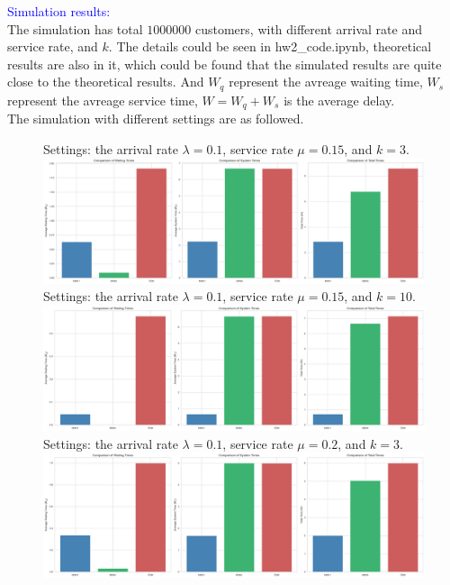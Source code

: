 \begin{homeworkProblem}
\textcolor{blue}{Simulation results:} \\
The simulation has total $1000000$ customers, with different arrival rate and service rate, and $k$. The details could be seen in hw2\_code.ipynb, theoretical results are also in it, which could be found that the simulated results are quite close to the theoretical results. And $W_q$ represent the avreage waiting time, $W_s$ represent the avreage service time, $W=W_q+W_s$ is the average delay. \\
The simulation with different settings are as followed.
\begin{figure}[h]
    \centering
    Settings: the arrival rate $\lambda = 0.1$, service rate $\mu = 0.15$, and $k=3$.
    \includegraphics[width=\textwidth]{./figure/scenario1.png}
    Settings: the arrival rate $\lambda = 0.1$, service rate $\mu = 0.15$, and $k=10$.
    \includegraphics[width=\textwidth]{./figure/scenario2.png}
    Settings: the arrival rate $\lambda = 0.1$, service rate $\mu = 0.2$, and $k=3$.
    \includegraphics[width=\textwidth]{./figure/scenario3.png}
\end{figure}
\vspace{1.0in}
\begin{figure}[h]

\end{figure}
\end{homeworkProblem}
